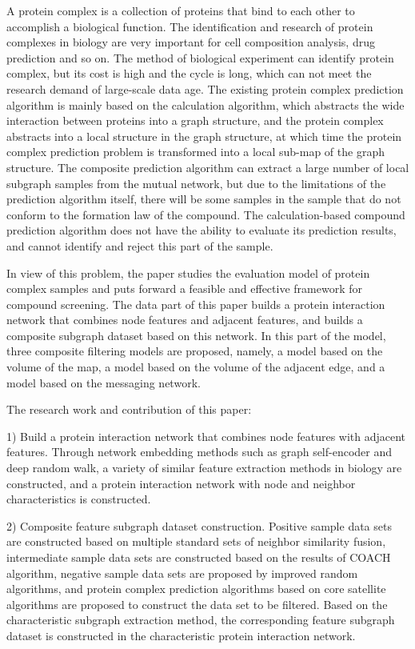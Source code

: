 \begin{eabstract}
  A protein complex is a collection of proteins that bind to each other to accomplish a biological function. The identification and research of protein complexes in biology are very important for cell composition analysis, drug prediction and so on. The method of biological experiment can identify protein complex, but its cost is high and the cycle is long, which can not meet the research demand of large-scale data age.
  The existing protein complex prediction algorithm is mainly based on the calculation algorithm, which abstracts the wide interaction between proteins into a graph structure, and the protein complex abstracts into a local structure in the graph structure, at which time the protein complex prediction problem is transformed into a local sub-map of the graph structure. The composite prediction algorithm can extract a large number of local subgraph samples from the mutual network, but due to the limitations of the prediction algorithm itself, there will be some samples in the sample that do not conform to the formation law of the compound. The calculation-based compound prediction algorithm does not have the ability to evaluate its prediction results, and cannot identify and reject this part of the sample.

  In view of this problem, the paper studies the evaluation model of protein complex samples and puts forward a feasible and effective framework for compound screening. The data part of this paper builds a protein interaction network that combines node features and adjacent features, and builds a composite subgraph dataset based on this network. In this part of the model, three composite filtering models are proposed, namely, a model based on the volume of the map, a model based on the volume of the adjacent edge, and a model based on the messaging network.

  The research work and contribution of this paper:

  1) Build a protein interaction network that combines node features with adjacent features. Through network embedding methods such as graph self-encoder and deep random walk, a variety of similar feature extraction methods in biology are constructed, and a protein interaction network with node and neighbor characteristics is constructed.

  2) Composite feature subgraph dataset construction. Positive sample data sets are constructed based on multiple standard sets of neighbor similarity fusion, intermediate sample data sets are constructed based on the results of COACH algorithm, negative sample data sets are proposed by improved random algorithms, and protein complex prediction algorithms based on core satellite algorithms are proposed to construct the data set to be filtered. Based on the characteristic subgraph extraction method, the corresponding feature subgraph dataset is constructed in the characteristic protein interaction network.


\end{eabstract}
